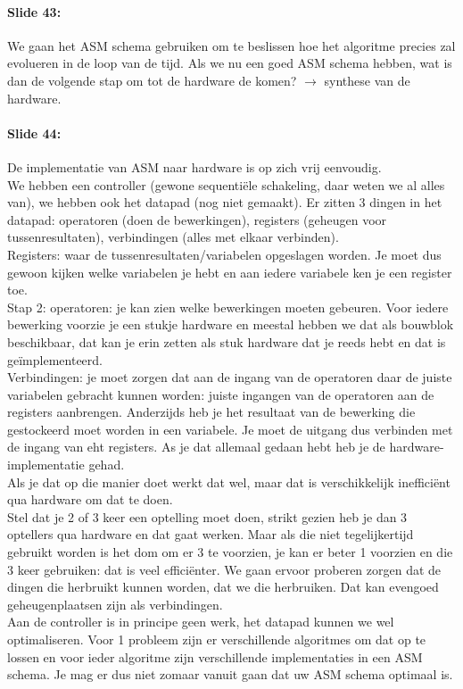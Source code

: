 \documentclass[10pt,a4paper]{book}
\begin{document}
\paragraph{Slide 43:} We gaan het ASM schema gebruiken om te beslissen hoe het algoritme precies zal evolueren in de loop van de tijd. Als we nu een goed ASM schema hebben, wat is dan de volgende stap om tot de hardware de komen? $\rightarrow$ synthese van de hardware. 

\paragraph{Slide 44:} De implementatie van ASM naar hardware is op zich vrij eenvoudig.\\
We hebben een controller (gewone sequenti\"ele schakeling, daar weten we al alles van), we hebben ook het datapad (nog niet gemaakt). Er zitten 3 dingen in het datapad: operatoren (doen de bewerkingen), registers (geheugen voor tussenresultaten), verbindingen (alles met elkaar verbinden).\\
Registers: waar de tussenresultaten/variabelen opgeslagen worden. Je moet dus gewoon kijken welke variabelen je hebt en aan iedere variabele ken je een register toe.\\
Stap 2: operatoren: je kan zien welke bewerkingen moeten gebeuren. Voor iedere bewerking voorzie je een stukje hardware en meestal hebben we dat als bouwblok beschikbaar, dat kan je erin zetten als stuk hardware dat je reeds hebt en dat is ge\"implementeerd.\\
Verbindingen: je moet zorgen dat aan de ingang van de operatoren daar de juiste variabelen gebracht kunnen worden: juiste ingangen van de operatoren aan de registers aanbrengen. Anderzijds heb je het resultaat van de bewerking die gestockeerd moet worden in een variabele. Je moet de uitgang dus verbinden met de ingang van eht registers. As je dat allemaal gedaan hebt heb je de hardware-implementatie gehad.\\
Als je dat op die manier doet werkt dat wel, maar dat is verschikkelijk ineffici\"ent qua hardware om dat te doen.\\
Stel dat je 2 of 3 keer een optelling moet doen, strikt gezien heb je dan 3 optellers qua hardware en dat gaat werken. Maar als die niet tegelijkertijd gebruikt worden is het dom om er 3 te voorzien, je kan er beter 1 voorzien en die 3 keer gebruiken: dat is veel effici\"enter. We gaan ervoor proberen zorgen dat de dingen die herbruikt kunnen worden, dat we die herbruiken. Dat kan evengoed geheugenplaatsen zijn als verbindingen.\\
Aan de controller is in principe geen werk, het datapad kunnen we wel optimaliseren. Voor 1 probleem zijn er verschillende algoritmes om dat op te lossen en voor ieder algoritme zijn verschillende implementaties in een ASM schema. Je mag er dus niet zomaar vanuit gaan dat uw ASM schema optimaal is.
\end{document}
